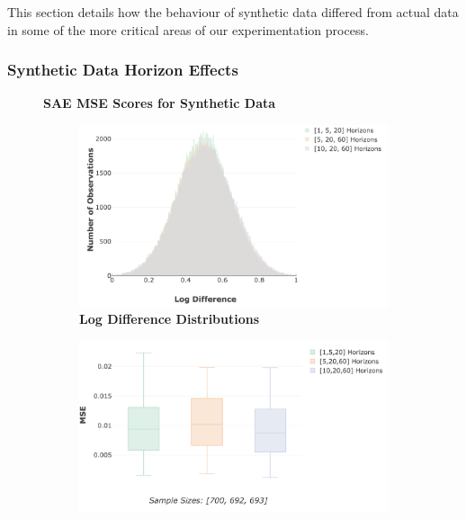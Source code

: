 \documentclass[a4paper,11pt,oneside]{article}
\theoremstyle{plain}
\theoremstyle{definition}
\begin{document}
	This section details how the behaviour of synthetic data differed from actual data in some of the more critical areas of our experimentation process.
	
	\subsubsection{Synthetic Data Horizon Effects}\label{results_synthdata_mse}
	
	\begin{figure}[H]
		\centering
		\textbf{SAE MSE Scores for Synthetic Data}
		\begin{subfigure}{.99\textwidth}
			\centering 
			\includegraphics[scale=0.4]{images/results/8_5_synthetic_data/test_aggregate_dist.png}
			\caption{\textbf{Log Difference Distributions} 
				\newline }
			\label{figure-test_aggregate_dist}
		\end{subfigure}
		\begin{subfigure}{.99\textwidth}
			\centering 
			\includegraphics[scale=0.4]{images/results/8_5_synthetic_data/test_aggregation_mse.png}

\end{subfigure}
\end{figure}
\end{document}
